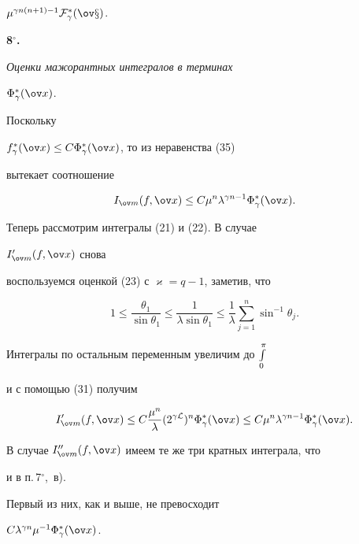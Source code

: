 $\mu^{\gamma n(n+1)-1}\cal F^*_\gamma(\ov x)$. 


\medskip 


 


{\bf 8${}^\circ$.}


{\it Оценки мажорантных интегралов в терминах 


$\Phi^*_\gamma(\ov x)$.} Поскольку 


$f^*_\gamma(\ov x)\le C\Phi^*_\gamma(\ov x)$, то из неравенства (35) 


вытекает соотношение 


\begin{equation} 


I_{\ov m}(f,\ov x)\le C\mu^n\lambda^{\gamma n-1} 


\Phi^*_\gamma(\ov x). 


\end{equation} 


Теперь рассмотрим интегралы (21) и (22). В случае 


$I'_{\ov m}(f,\ov x)$ снова 


воспользуемся оценкой (23) с $\varkappa=q-1$, заметив, что 


$$ 


1\le\frac{\theta_1}{\sin\theta_1}\le 


\frac{1}{\lambda\sin\theta_1}\le\frac{1}{\lambda} 


\sum^n_{j=1}\sin^{-1}\theta_j. 


$$ 


Интегралы по остальным переменным увеличим до $\int\limits^\pi_0$ 


и с помощью (31) получим 


\begin{equation} 


I'_{\ov m}(f,\ov x)\le C\frac{\mu^n}{\lambda} 


(2^{\gamma\cal L})^n\Phi^*_\gamma(\ov x)\le 


C\mu^n\lambda^{\gamma n-1}\Phi^*_\gamma(\ov x). 


\end{equation} 


 


В случае $I''_{\ov m}(f,\ov x)$ имеем те же три кратных интеграла, что 


и в п.\,7${}^\circ$,~в). 


Первый из них, как и выше, не превосходит 


$C\lambda^{\gamma n}\mu^{-1}\Phi^*_\gamma(\ov x)$. 


